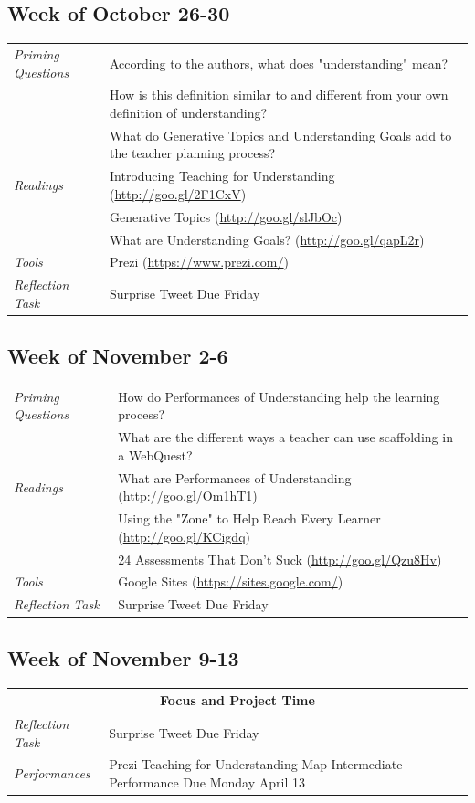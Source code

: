 \documentclass{tufte-handout}
\newcommand{\tabpq}{\faQuestionSign\medspace\textit{Priming Questions}}
\newcommand{\tabread}{\faBook\medspace\textit{Readings}}
\newcommand{\tabtools}{\faWrench\medspace\textit{Tools}}
\newcommand{\tabtweet}{\faLightbulb\medspace\textit{Reflection Task} & Surprise Tweet Due Friday \\}
\newcommand{\tabperformance}{\faTasks\medspace\textit{Performances}}
\newenvironment{tabsched}
	{\small
	\begin{tabular}{p{1.5in}p{4.5in}}
	\toprule}
	{\bottomrule
	\end{tabular}
	\normalsize}
\newcommand{\weekeleven}{October 26-30}
\newcommand{\weektwelve}{November 2-6}
\newcommand{\weekthirteen}{November 9-13}
\begin{document}
\subsection{Week of \weekeleven}

\begin{tabsched}
	\tabpq & According to the authors, what does "understanding" mean? \\
	& How is this definition similar to and different from your own definition of understanding? \\
	& What do Generative Topics and Understanding Goals add to the teacher planning process? \\
	\midrule
	\tabread & Introducing Teaching for Understanding (\url{http://goo.gl/2F1CxV}) \\
	& Generative Topics (\url{http://goo.gl/slJbOc}) \\
	& What are Understanding Goals? (\url{http://goo.gl/qapL2r}) \\
	\midrule
	\tabtools & Prezi (\url{https://www.prezi.com/}) \\
	\midrule
	\tabtweet
\end{tabsched}

\subsection{Week of \weektwelve}

\begin{tabsched}
	\tabpq & How do Performances of Understanding help the learning process? \\
	& What are the different ways a teacher can use scaffolding in a WebQuest? \\
	\midrule
	\tabread & What are Performances of Understanding (\url{http://goo.gl/Om1hT1}) \\
	& Using the "Zone" to Help Reach Every Learner (\url{http://goo.gl/KCigdq}) \\
	& 24 Assessments That Don't Suck (\url{http://goo.gl/Qzu8Hv}) \\
	\midrule
	\tabtools & Google Sites (\url{https://sites.google.com/}) \\
	\midrule
	\tabtweet
\end{tabsched}

\subsection{Week of \weekthirteen}

\begin{tabsched}
	\multicolumn{2}{c}{\textbf{Focus and Project Time}} \\
	\midrule
	\tabtweet
	\midrule
	\tabperformance & Prezi Teaching for Understanding Map Intermediate Performance Due Monday April 13 \\
\end{tabsched}
\end{document}
